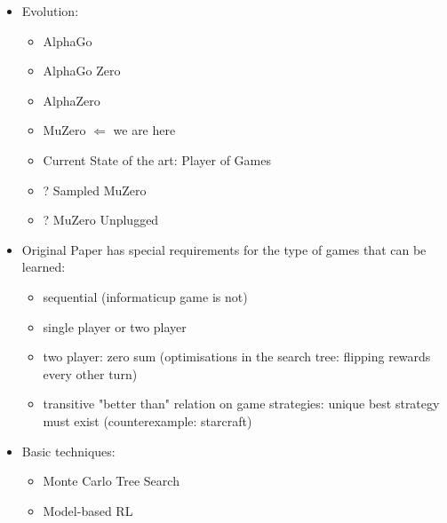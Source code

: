 \begin{itemize}
    \item Evolution:
    \begin{itemize}
        \item AlphaGo
        \item AlphaGo Zero \cite{alphago_zero}
        \item AlphaZero \cite{alphazero}
        \item MuZero \cite{muzero} $\Longleftarrow$ we are here
        \item Current State of the art: Player of Games
        \item ? Sampled MuZero
        \item ? MuZero Unplugged
    \end{itemize}
    \item Original Paper has special requirements for the type of games
    that can be learned:
    \begin{itemize}
        \item sequential (informaticup game is not)
        \item single player or two player
        \item two player: zero sum (optimisations in the search tree:
        flipping rewards every other turn)
        \item transitive "better than" relation on game strategies: unique best
        strategy must exist (counterexample: starcraft)
    \end{itemize}
    \item Basic techniques:
    \begin{itemize}
        \item Monte Carlo Tree Search \cite{mcts_survey}
        \item Model-based RL
    \end{itemize}
\end{itemize}
